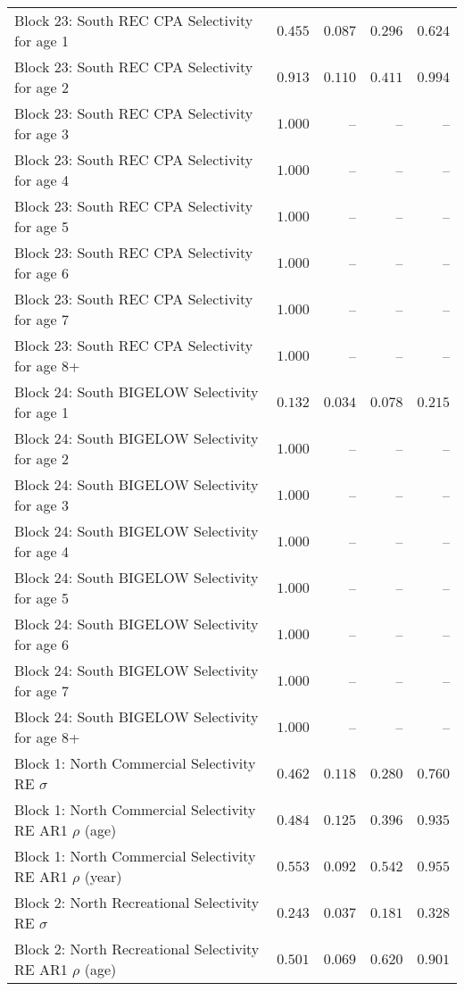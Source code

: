 \documentclass[
]{article}
\begin{document}
\begin{landscape}
\begin{longtable}[t]{lrrrr}
Block 23: South REC CPA Selectivity for age 1 & $0.455$ & $0.087$ & $0.296$ & $0.624$\\
Block 23: South REC CPA Selectivity for age 2 & $0.913$ & $0.110$ & $0.411$ & $0.994$\\
\addlinespace
Block 23: South REC CPA Selectivity for age 3 & $1.000$ & -- & -- & --\\
Block 23: South REC CPA Selectivity for age 4 & $1.000$ & -- & -- & --\\
Block 23: South REC CPA Selectivity for age 5 & $1.000$ & -- & -- & --\\
Block 23: South REC CPA Selectivity for age 6 & $1.000$ & -- & -- & --\\
Block 23: South REC CPA Selectivity for age 7 & $1.000$ & -- & -- & --\\
\addlinespace
Block 23: South REC CPA Selectivity for age 8+ & $1.000$ & -- & -- & --\\
Block 24: South BIGELOW Selectivity for age 1 & $0.132$ & $0.034$ & $0.078$ & $0.215$\\
Block 24: South BIGELOW Selectivity for age 2 & $1.000$ & -- & -- & --\\
Block 24: South BIGELOW Selectivity for age 3 & $1.000$ & -- & -- & --\\
Block 24: South BIGELOW Selectivity for age 4 & $1.000$ & -- & -- & --\\
\addlinespace
Block 24: South BIGELOW Selectivity for age 5 & $1.000$ & -- & -- & --\\
Block 24: South BIGELOW Selectivity for age 6 & $1.000$ & -- & -- & --\\
Block 24: South BIGELOW Selectivity for age 7 & $1.000$ & -- & -- & --\\
Block 24: South BIGELOW Selectivity for age 8+ & $1.000$ & -- & -- & --\\
Block 1: North Commercial Selectivity RE $\sigma$ & $0.462$ & $0.118$ & $0.280$ & $0.760$\\
\addlinespace
Block 1: North Commercial Selectivity RE AR1 $\rho$ (age) & $0.484$ & $0.125$ & $0.396$ & $0.935$\\
Block 1: North Commercial Selectivity RE AR1 $\rho$ (year) & $0.553$ & $0.092$ & $0.542$ & $0.955$\\
Block 2: North Recreational Selectivity RE $\sigma$ & $0.243$ & $0.037$ & $0.181$ & $0.328$\\
Block 2: North Recreational Selectivity RE AR1 $\rho$ (age) & $0.501$ & $0.069$ & $0.620$ & $0.901$\\

\end{longtable}
\end{landscape}
\end{document}
